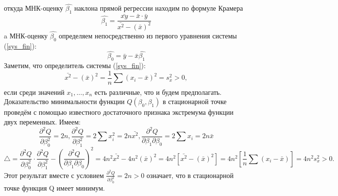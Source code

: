 \documentclass[a4paper]{article}
\begin{document}
	откуда МНК-оценку $\hat{\beta_1}$ наклона прямой регрессии находим по формуле Крамера
	\begin{equation}
	    \hat{\beta_{1}} = \frac{\bar{xy} - \bar{x} \cdot \bar{y}}{\bar{x^{2}} - (\bar{x})^{2}}
	    \label{beta_1_new}
	\end{equation}
	a МНК-оценку $\hat{\beta_0}$  определяем непосредственно из первого уравнения системы (\ref{sys_fin}):
	\begin{equation}
	    \hat{\beta_{0}} = \bar{y} - \bar{x}\hat{\beta_{1}}
	    \label{beta_0_new}
	\end{equation}
	Заметим, что определитель системы (\ref{sys_fin}):
	$$
	    \bar{x^{2}} - (\bar{x})^{2} = \frac{1}{n}\sum_{}{}{(x_{i} - \bar{x})^{2}} = s_{x}^{2} > 0, 
	$$
	если среди значений $x_{1},...,x_{n}$ есть различные, что и будем предполагать.
	\newline
	Доказательство минимальности функции $Q(\beta_{0}, \beta_{1})$ в стационарной точке проведём с помощью известного достаточного признака экстремума функции двух переменных. Имеем:
	$$
	    \frac{\partial ^{2} Q}{\partial \beta_{0}^{2}} = 2n, 
        \frac{\partial ^{2} Q}{\partial \beta_{1}^{2}} = 2\sum_{}{}{x_{i}^{2}} = 2n\bar{x^{2}}, 
        \frac{\partial ^{2} Q}{\partial \beta_{1} \partial \beta_{0}} = 2\sum_{}{}{x_{i}} = 2n\bar{x}
        \label{frac_eq}
	$$
	$$
	    \bigtriangleup = \frac{\partial^{2}Q}{\partial \beta_{0}^{2}} \cdot \frac{\partial^{2}Q}{\partial \beta_{1}^{2}} - (\frac{\partial^{2}Q}{\partial \beta_{1} \partial \beta_{0}})^{2} = 
	    4n^{2}\bar{x^{2}} - 4n^2(\bar{x})^{2} = 
	    4n^{2}\left[\bar{x^{2}} - (\bar{x})^{2}\right] = 4n^{2}\left[ \frac{1}{n}\sum{}_{}{(x_{i} - \bar{x})}\right] = 4n^{2}s_{x}^{2} > 0.
	    \label{det_sys}
	$$
	Этот результат вместе с условием $\frac{\partial^{2}Q}{\partial \beta_{0}^{2}} = 2n > 0$ означает, что в стационарной точке функция Q имеет минимум.
\end{document}
